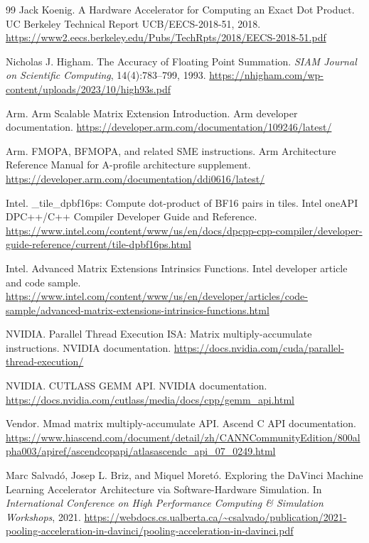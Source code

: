 \documentclass[UTF8,11pt,a4paper]{ctexart}
\begin{document}
\begin{thebibliography}{99}
Jack Koenig.
\newblock A Hardware Accelerator for Computing an Exact Dot Product.
\newblock UC Berkeley Technical Report UCB/EECS-2018-51, 2018.
\newblock \url{https://www2.eecs.berkeley.edu/Pubs/TechRpts/2018/EECS-2018-51.pdf}

Nicholas J. Higham.
\newblock The Accuracy of Floating Point Summation.
\newblock \emph{SIAM Journal on Scientific Computing}, 14(4):783--799, 1993.
\newblock \url{https://nhigham.com/wp-content/uploads/2023/10/high93s.pdf}

Arm.
\newblock Arm Scalable Matrix Extension Introduction.
\newblock Arm developer documentation.
\newblock \url{https://developer.arm.com/documentation/109246/latest/}

Arm.
\newblock FMOPA, BFMOPA, and related SME instructions.
\newblock Arm Architecture Reference Manual for A-profile architecture supplement.
\newblock \url{https://developer.arm.com/documentation/ddi0616/latest/}

Intel.
\newblock \_tile\_dpbf16ps: Compute dot-product of BF16 pairs in tiles.
\newblock Intel oneAPI DPC++/C++ Compiler Developer Guide and Reference.
\newblock \url{https://www.intel.com/content/www/us/en/docs/dpcpp-cpp-compiler/developer-guide-reference/current/tile-dpbf16ps.html}

Intel.
\newblock Advanced Matrix Extensions Intrinsics Functions.
\newblock Intel developer article and code sample.
\newblock \url{https://www.intel.com/content/www/us/en/developer/articles/code-sample/advanced-matrix-extensions-intrinsics-functions.html}

NVIDIA.
\newblock Parallel Thread Execution ISA: Matrix multiply-accumulate instructions.
\newblock NVIDIA documentation.
\newblock \url{https://docs.nvidia.com/cuda/parallel-thread-execution/}

NVIDIA.
\newblock CUTLASS GEMM API.
\newblock NVIDIA documentation.
\newblock \url{https://docs.nvidia.com/cutlass/media/docs/cpp/gemm_api.html}

Vendor.
\newblock Mmad matrix multiply-accumulate API.
\newblock Ascend C API documentation.
\newblock \url{https://www.hiascend.com/document/detail/zh/CANNCommunityEdition/800alpha003/apiref/ascendcopapi/atlasascendc_api_07_0249.html}

Marc Salvad\'o, Josep L. Briz, and Miquel Moret\'o.
\newblock Exploring the DaVinci Machine Learning Accelerator Architecture via Software-Hardware Simulation.
\newblock In \emph{International Conference on High Performance Computing \& Simulation Workshops}, 2021.
\newblock \url{https://webdocs.cs.ualberta.ca/~csalvado/publication/2021-pooling-acceleration-in-davinci/pooling-acceleration-in-davinci.pdf}


\end{thebibliography}
\end{document}
